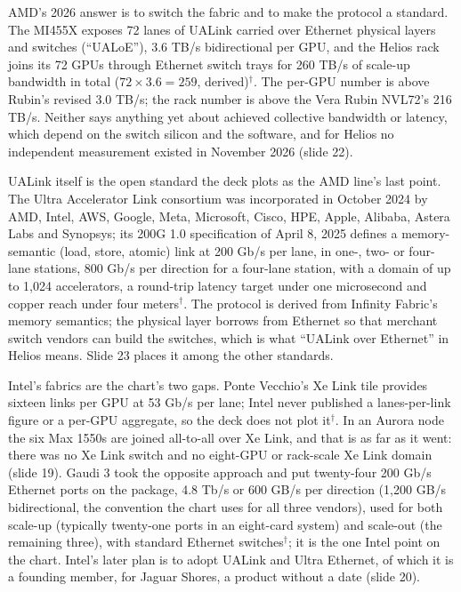 \documentclass[11pt,letterpaper]{article}
\begin{document}
AMD's 2026 answer is to switch the fabric and to make the protocol a standard. The MI455X exposes 72 lanes of UALink carried over Ethernet physical layers and switches (``UALoE''), 3.6 TB/s bidirectional per GPU, and the Helios rack joins its 72 GPUs through Ethernet switch trays for 260 TB/s of scale-up bandwidth in total ($72\times 3.6 = 259$, derived)$^\dagger$. The per-GPU number is above Rubin's revised 3.0 TB/s; the rack number is above the Vera Rubin NVL72's 216 TB/s. Neither says anything yet about achieved collective bandwidth or latency, which depend on the switch silicon and the software, and for Helios no independent measurement existed in November 2026 (slide 22).

UALink itself is the open standard the deck plots as the AMD line's last point. The Ultra Accelerator Link consortium was incorporated in October 2024 by AMD, Intel, AWS, Google, Meta, Microsoft, Cisco, HPE, Apple, Alibaba, Astera Labs and Synopsys; its 200G 1.0 specification of April 8, 2025 defines a memory-semantic (load, store, atomic) link at 200 Gb/s per lane, in one-, two- or four-lane stations, 800 Gb/s per direction for a four-lane station, with a domain of up to 1{,}024 accelerators, a round-trip latency target under one microsecond and copper reach under four meters$^\dagger$. The protocol is derived from Infinity Fabric's memory semantics; the physical layer borrows from Ethernet so that merchant switch vendors can build the switches, which is what ``UALink over Ethernet'' in Helios means. Slide 23 places it among the other standards.

Intel's fabrics are the chart's two gaps. Ponte Vecchio's Xe Link tile provides sixteen links per GPU at 53 Gb/s per lane; Intel never published a lanes-per-link figure or a per-GPU aggregate, so the deck does not plot it$^\dagger$. In an Aurora node the six Max 1550s are joined all-to-all over Xe Link, and that is as far as it went: there was no Xe Link switch and no eight-GPU or rack-scale Xe Link domain (slide 19). Gaudi 3 took the opposite approach and put twenty-four 200 Gb/s Ethernet ports on the package, 4.8 Tb/s or 600 GB/s per direction (1{,}200 GB/s bidirectional, the convention the chart uses for all three vendors), used for both scale-up (typically twenty-one ports in an eight-card system) and scale-out (the remaining three), with standard Ethernet switches$^\dagger$; it is the one Intel point on the chart. Intel's later plan is to adopt UALink and Ultra Ethernet, of which it is a founding member, for Jaguar Shores, a product without a date (slide 20).
\end{document}
